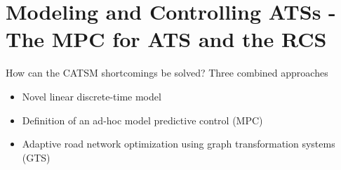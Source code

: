 \section{Modeling and Controlling ATSs - The MPC for ATS and the RCS} 

\begin{frame}{How can the CATSM shortcomings be solved?}
	Three combined approaches
	\vspace{0.5cm}
	\begin{itemize}
		\item Novel linear discrete-time model
		\item Definition of an ad-hoc model predictive control (MPC) 
		\item Adaptive road network optimization using graph transformation systems (GTS)
	\end{itemize}
\end{frame}

